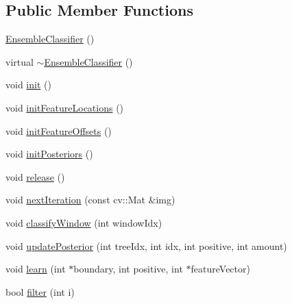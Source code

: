 \subsection*{Public Member Functions}
\begin{DoxyCompactItemize}
\item 
\hyperlink{classtld_1_1_ensemble_classifier_a7ce76942175fecdf2b44be726f1f7a89}{EnsembleClassifier} ()
\item 
virtual \hyperlink{classtld_1_1_ensemble_classifier_a71a3976d9dccf15dcdd6a14826d5ec5a}{$\sim$EnsembleClassifier} ()
\item 
void \hyperlink{classtld_1_1_ensemble_classifier_afb0e8ed03adef91257801bf0e3ca73f7}{init} ()
\item 
void \hyperlink{classtld_1_1_ensemble_classifier_a3fc444f59e0f23a97f9889e58adaba73}{initFeatureLocations} ()
\item 
void \hyperlink{classtld_1_1_ensemble_classifier_a92ddef7701b1062b1f4a53e5cfcd79a2}{initFeatureOffsets} ()
\item 
void \hyperlink{classtld_1_1_ensemble_classifier_ab342db231d14bbaa892b2664d210e152}{initPosteriors} ()
\item 
void \hyperlink{classtld_1_1_ensemble_classifier_a3fd93c80d37f7f115443c2e147ec9967}{release} ()
\item 
void \hyperlink{classtld_1_1_ensemble_classifier_a7871296c03de06293ebd3dc29ecab5de}{nextIteration} (const cv::Mat \&img)
\item 
void \hyperlink{classtld_1_1_ensemble_classifier_abf7e915ff675720293502be0452cb6c2}{classifyWindow} (int windowIdx)
\item 
void \hyperlink{classtld_1_1_ensemble_classifier_acfc0c9d71c16dfed9750b6aa409afb0c}{updatePosterior} (int treeIdx, int idx, int positive, int amount)
\item 
void \hyperlink{classtld_1_1_ensemble_classifier_ad088404fdea039b774c2eb088e4cfc04}{learn} (int $\ast$boundary, int positive, int $\ast$featureVector)
\item 
bool \hyperlink{classtld_1_1_ensemble_classifier_a42f1f3606d14a7d274f5bb9f4fa5030f}{filter} (int i)
\end{DoxyCompactItemize}

